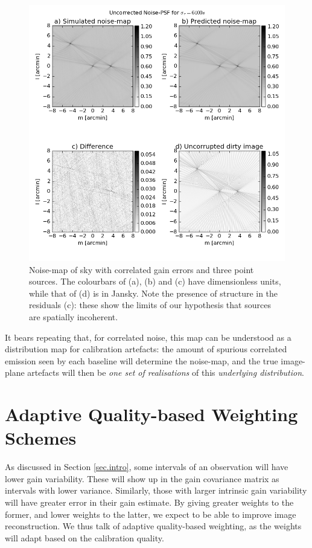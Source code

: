 \begin{figure}[h!]
\centering
\includegraphics[width=\textwidth]{images/Ctime6400-noisePSFandDirty-uncorr.png}
\caption{\label{imag.simu-3sources.noisemap} {Noise-map of sky with correlated gain errors and three point sources. The colourbars of (a), (b) and (c) have dimensionless units, while that of (d) is in Jansky. Note the presence of structure in the residuals (c): these show the limits of our hypothesis that sources are spatially incoherent.}}
\end{figure}

\pg
It bears repeating that, for correlated noise, this map can be understood as a distribution map for calibration artefacts: the amount of spurious correlated emission seen by each baseline will determine the noise-map, and the true image-plane artefacts will then be \emph{one set of realisations} of this \emph{underlying distribution}.

\section{Adaptive Quality-based Weighting Schemes}\label{sec.DynamicRange}

\pg
As discussed in Section \ref{sec.intro}, some intervals of an observation will have lower gain variability. These will show up in the gain covariance matrix as intervals with lower variance. Similarly, those with larger intrinsic gain variability will have greater error in their gain estimate. By giving greater weights to the former, and lower weights to the latter, we expect to be able to improve image reconstruction. {We thus talk of adaptive quality-based weighting, as the weights will adapt based on the calibration quality.}

